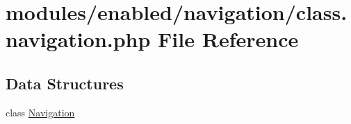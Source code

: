 \hypertarget{class_8navigation_8php}{\section{modules/enabled/navigation/class.navigation.\-php File Reference}
\label{class_8navigation_8php}
}
\subsection*{Data Structures}
\begin{DoxyCompactItemize}
\item 
class \hyperlink{class_navigation}{Navigation}
\end{DoxyCompactItemize}
